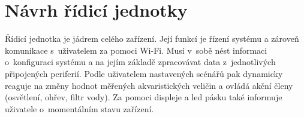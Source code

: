 \chapter{Návrh řídicí jednotky}
    Řídicí jednotka je jádrem celého zařízení. Její funkcí je řízení systému a zároveň komunikace s~uživatelem za pomoci Wi-Fi. Musí v~sobě nést informaci o~konfiguraci systému a na jejím základě zpracovávat data z~jednotlivých připojených periferií. Podle uživatelem nastavených scénářů pak dynamicky reaguje na změny hodnot měřených akvaristických veličin a ovládá akční členy (osvětlení, ohřev, filtr vody). Za pomoci displeje a \acs{led} pásku také informuje uživatele o~momentálním stavu zařízení. 

    

    \clearpage
    
    

            